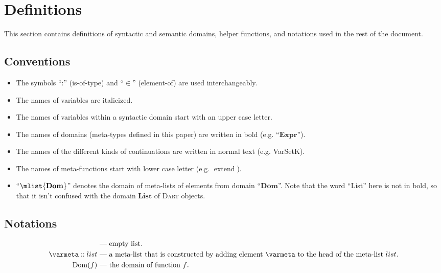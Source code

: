 \documentclass[a4paper,oneside,fleqn]{article}
\newcommand{\dart}{\textsc{Dart}}
\DeclareMathOperator{\dom}{Dom} %
\DeclareMathOperator{\extend}{extend}
\newcommand{\dexpr}{\mathbf{Expr}}
\newcommand{\ddom}{\mathbf{Dom}}    %
\newcommand{\dsemlist}{\mathbf{List}}
\begin{document}
\section{Definitions}
\label{sec:definitions}

This section contains definitions of syntactic and semantic domains, helper functions, and notations used in the rest of the document.


\subsection{Conventions}
\label{subsec:conventions}

\begin{itemize}
    \item The symbols ``:'' (is-of-type) and ``$\in$'' (element-of) are used interchangeably.
    \item The names of variables are italicized.
    \item The names of variables within a syntactic domain start with an upper case letter.
    \item The names of domains (meta-types defined in this paper) are written in bold (e.g. ``$\dexpr$'').
    \item The names of the different kinds of continuations are written in normal text (e.g. VarSetK).
    \item The names of meta-functions start with lower case letter (e.g. $\extend$).
    \item ``$\mlist{\ddom}$'' denotes the domain of meta-lists of elements from domain ``$\ddom$''.
        Note that the word ``List'' here is not in bold, so that it isn't confused with the domain $\dsemlist$ of \dart{} objects.
\end{itemize}

\subsection{Notations}
\label{subsec:notations}

\begin{align*}
    [] &\text{ --- empty list}.\\
    \varmeta :: list &\text{ --- a meta-list that is constructed by adding element $\varmeta$ to the head of the meta-list $list$}.\\
    \dom(f) &\text{ --- the domain of function \(f\)}.
\end{align*}
\end{document}
